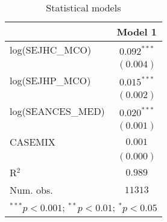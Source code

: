 
\begin{table}
\begin{center}
\begin{tabular}{l c}
\hline
 & Model 1 \\
\hline
log(SEJHC\_MCO)   & $0.092^{***}$ \\
                  & $(0.004)$     \\
log(SEJHP\_MCO)   & $0.015^{***}$ \\
                  & $(0.002)$     \\
log(SEANCES\_MED) & $0.020^{***}$ \\
                  & $(0.001)$     \\
CASEMIX           & $0.001$       \\
                  & $(0.000)$     \\
\hline
R$^2$             & $0.989$       \\
Num. obs.         & $11313$       \\
\hline
\multicolumn{2}{l}{\scriptsize{$^{***}p<0.001$; $^{**}p<0.01$; $^{*}p<0.05$}}
\end{tabular}
\caption{Statistical models}
\label{table:coefficients}
\end{center}
\end{table}
